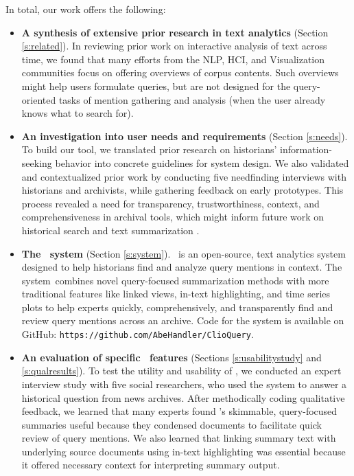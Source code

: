 In total, our work offers the following:
\begin{itemize}
\item \textbf{A synthesis of extensive prior research in text analytics} (Section \ref{s:related}). 
In reviewing prior work on interactive analysis of text across time, we found that many efforts from the NLP, HCI, and Visualization communities focus on offering overviews of corpus contents.
Such overviews might help users formulate queries, but are not designed for the query-oriented tasks of mention gathering and analysis (when the user already knows what to search for).
\item \textbf{An investigation into user needs and requirements} (Section \ref{s:needs}). 
To build our tool, we translated prior research on historians' information-seeking behavior into concrete guidelines for system design. 
We also validated and contextualized prior work by conducting five needfinding interviews with historians and archivists, while gathering feedback on early prototypes.
This process revealed a need for transparency, trustworthiness, context, and comprehensiveness in archival tools, which might 
inform future work on historical search \cite{histdiv,expedition} and text summarization \cite{das2007survey,nenkova2012survey}.
\item \textbf{The \ours~system} (Section \ref{s:system}). \ours~is an open-source, text analytics system designed to help historians find and analyze query mentions in context. The system~combines novel query-focused summarization methods with more traditional features like linked views, in-text highlighting, and time series plots to help experts quickly, comprehensively, and transparently find and review query mentions across an archive. Code for the system is available on GitHub: \texttt{https://github.com/AbeHandler/ClioQuery}.
\item \textbf{An evaluation of specific \ours~features} (Sections \ref{s:usabilitystudy} and \ref{s:qualresults}). 
To test the utility and usability of \ours, we conducted an expert interview study with five social researchers, who used the system to answer a historical question from news archives.
After methodically coding qualitative feedback, we learned that many experts found \ours's skimmable, query-focused summaries useful because they condensed documents to facilitate quick review of query mentions.
We also learned that linking summary text with underlying source documents using in-text highlighting was essential because it offered necessary context for interpreting summary output.

\end{itemize}
